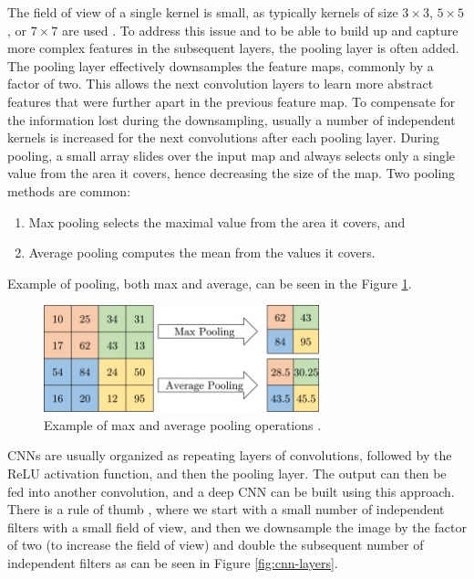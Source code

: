 The field of view of a single kernel is small, as typically kernels of size $3\!\times\!3$, $5\!\times\!5$, or $7\!\times\!7$ are used \cite{Santosh2022-2}. To address this issue and to be able to build up and capture more complex features in the subsequent layers, the pooling layer is often added. The pooling layer effectively downsamples the feature maps, commonly by a factor of two. This allows the next convolution layers to learn more abstract features that were further apart in the previous feature map. To compensate for the information lost during the downsampling, usually a number of independent kernels is increased for the next convolutions after each pooling layer. During pooling, a small array slides over the input map and always selects only a single value from the area it covers, hence decreasing the size of the map. Two pooling methods are common:

\begin{enumerate}
    \item Max pooling selects the maximal value from the area it covers, and
    \item Average pooling computes the mean from the values it covers.
\end{enumerate}

Example of pooling, both max and average, can be seen in the Figure \ref{fig:pooling}.

\begin{figure}[H]
\begin{centering}
\includegraphics[width=8cm]{assets/images/pooling.jpg}
\par\end{centering}
\caption{Example of max and average pooling operations \cite{Santosh2022-2}.}
\label{fig:pooling}
\end{figure}

CNNs are usually organized as repeating layers of convolutions, followed by the ReLU activation function, and then the pooling layer. The output can then be fed into another convolution, and a deep CNN can be built using this approach. There is a rule of thumb \cite{Santosh2022-3}, where we start with a small number of independent filters with a small field of view, and then we downsample the image by the factor of two (to increase the field of view) and double the subsequent number of independent filters as can be seen in Figure \ref{fig:cnn-layers}.

